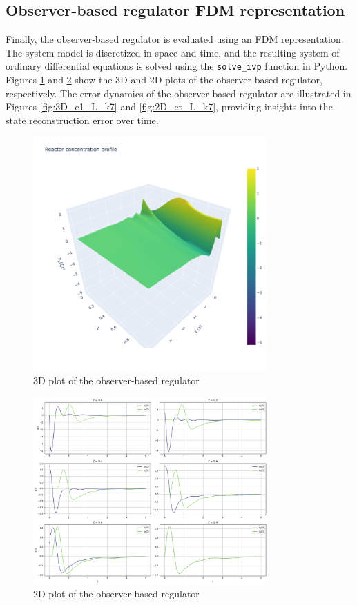 \subsection{Observer-based regulator FDM representation}

Finally, the observer-based regulator is evaluated using an FDM representation. The system model is discretized in space and time, and the resulting system of ordinary differential equations is solved using the \texttt{solve\_ivp} function in Python. Figures \ref{fig:3D_x1_L_k7} and \ref{fig:2D_xt_L_k7} show the 3D and 2D plots of the observer-based regulator, respectively. The error dynamics of the observer-based regulator are illustrated in Figures \ref{fig:3D_e1_L_k7} and \ref{fig:2D_et_L_k7}, providing insights into the state reconstruction error over time.

\begin{figure}[H]
    \centering
    \includegraphics[width=0.8\textwidth]{Figures/3D_x1_L_k7.png}
    \caption{3D plot of the observer-based regulator}
    \label{fig:3D_x1_L_k7}
\end{figure}

\begin{figure}[H]
    \centering
    \includegraphics[width=0.8\textwidth]{Figures/2D_xt_L_k7.png}
    \caption{2D plot of the observer-based regulator}
    \label{fig:2D_xt_L_k7}
\end{figure}

